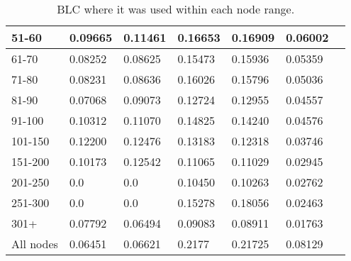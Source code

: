 \begin{table*}[h!]
\begin{tabular}{|l|l|l||l|l||l|l|}
        51-60     & 0.09665                                 & 0.11461                        & 0.16653                          & 0.16909        & 0.06002       &                \\ \hline
        61-70     & 0.08252                                 & 0.08625                        & 0.15473                          & 0.15936        & 0.05359       &                \\ \hline
        71-80     & 0.08231                                 & 0.08636                        & 0.16026                          & 0.15796        & 0.05036       &                \\ \hline
        81-90     & 0.07068                                 & 0.09073                        & 0.12724                          & 0.12955        & 0.04557       &                \\ \hline
        91-100    & 0.10312                                 & 0.11070                        & 0.14825                          & 0.14240        & 0.04576       &                \\ \hline
        101-150   & 0.12200                                 & 0.12476                        & 0.13183                          & 0.12318        & 0.03746       &                \\ \hline
        151-200   & 0.10173                                 & 0.12542                        & 0.11065                          & 0.11029        & 0.02945       &                \\ \hline
        201-250   & 0.0                                     & 0.0                            & 0.10450                          & 0.10263        & 0.02762       &                \\ \hline
        251-300   & 0.0                                     & 0.0                            & 0.15278                          & 0.18056        & 0.02463       &                \\ \hline
        301+      & 0.07792                                 & 0.06494                        & 0.09083                          & 0.08911        & 0.01763       &                \\ \hline
        All nodes & 0.06451                                 & 0.06621                        & 0.2177                           & 0.21725        & 0.08129       &                \\ \hline
    \end{tabular}
    \caption{BLC where it was used within each node range.}
    \label{tab:BLC-degree-based-recall}
\end{table*}
